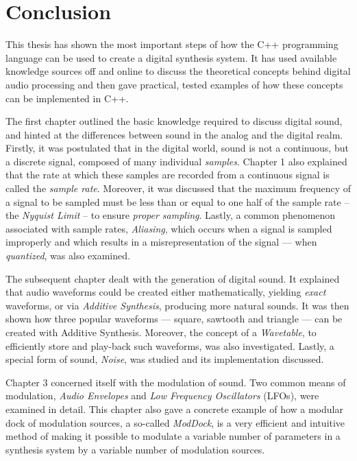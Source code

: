 \chapter*{Conclusion}

This thesis has shown the most important steps of how the C++ programming language can be used to create a digital synthesis system. It has used available knowledge sources off and online to discuss the theoretical concepts behind digital audio processing and then gave practical, tested examples of how these concepts can be implemented in C++. \parbreak

The first chapter outlined the basic knowledge required to discuss digital sound, and hinted at the differences between sound in the analog and the digital realm. Firstly, it was postulated that in the digital world, sound is not a continuous, but a discrete signal, composed of many individual \emph{samples}. Chapter 1 also explained that the rate at which these samples are recorded from a continuous signal is called the \emph{sample rate}. Moreover, it was discussed that the maximum frequency of a signal to be sampled must be less than or equal to one half of the sample rate -- the \emph{Nyquist Limit} -- to ensure \emph{proper sampling}. Lastly, a common phenomenon associated with sample rates, \emph{Aliasing}, which occurs when a signal is sampled improperly and which results in a misrepresentation of the signal --- when \emph{quantized}, was also examined. \parbreak

The subsequent chapter dealt with the generation of digital sound. It explained that audio waveforms could be created either mathematically, yielding \emph{exact} waveforms, or via \emph{Additive Synthesis}, producing more natural sounds. It was then shown how three popular waveforms --- square, sawtooth and triangle --- can be created with Additive Synthesis. Moreover, the concept of a \emph{Wavetable}, to efficiently store and play-back such waveforms, was also investigated. Lastly, a special form of sound, \emph{Noise}, was studied and its implementation discussed. \parbreak

Chapter 3 concerned itself with the modulation of sound. Two common means of modulation, \emph{Audio Envelopes} and \emph{Low Frequency Oscillators} (LFOs), were examined in detail. This chapter also gave a concrete example of how a modular dock of modulation sources, a so-called \emph{ModDock}, is a very efficient and intuitive method of making it possible to modulate a variable number of parameters in a synthesis system by a variable number of modulation sources. \parbreak

